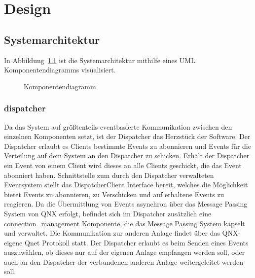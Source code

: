 \chapter{Design}\label{ch:design}



\section{Systemarchitektur}\label{sec:systemarchitektur}


In Abbildung~\ref{fig:cmp} ist die Systemarchitektur mithilfe eines UML Komponentendiagramms
visualisiert.

\begin{figure}[H]
    \centering
    \caption{Komponentendiagramm}
    \label{fig:cmp}
\end{figure}

\subsection{dispatcher}\label{subsec:cmp-dispatcher}
Da das System auf größtenteils eventbasierte Kommunikation zwischen den einzelnen Komponenten setzt,
ist der Dispatcher das Herzstück der Software. Der Dispatcher erlaubt es Clients bestimmte Events zu abonnieren
und Events für die Verteilung auf dem System an den Dispatcher zu schicken. Erhält der Dispatcher ein Event von einem
Client wird dieses an alle Clients geschickt, die das Event abonniert haben. Schnittstelle zum durch den Dispatcher
verwalteten Eventsystem stellt das DispatcherClient Interface bereit, welches die Möglichkeit bietet Events zu abonnieren,
zu Verschicken und auf erhaltene Events zu reagieren. Da die Übermittlung von Events asynchron über das Message Passing System
von QNX erfolgt, befindet sich im Dispatcher zusätzlich eine connection\_management Komponente, die das Message Passing System
kapselt und verwaltet. Die Kommunikation zur anderen Anlage findet über das QNX-eigene Qnet Protokoll statt.
Der Dispatcher erlaubt es beim Senden eines Events auszuwählen, ob dieses nur auf der eigenen Anlage empfangen werden soll,
oder auch an den Dispatcher der verbundenen anderen Anlage weitergeleitet werden soll.

